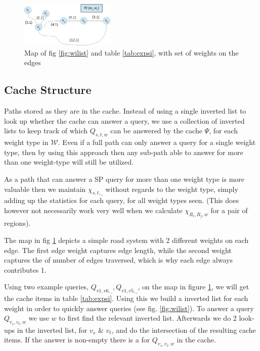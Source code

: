 \begin{figure}[hbt]
  \center
        \includegraphics[width=0.4\textwidth]{figures/map1}
        \caption{Map of fig \ref{fig:wilist} and table \ref{tab:expsi}, with set of weights on the edges}
  \label{fig:map1}
\end{figure}


\subsection{Cache Structure}

Paths stored as they are in the cache. Instead of using a single inverted list to look up whether the cache can answer a query, we use a collection of inverted lists to keep track of which $Q_{s,t,w}$ can be answered by the cache $\Psi$, for each weight type in $\mathcal{W}$.
Even if a full path can only answer a query for a single weight type, then by using this approach then any sub-path able to answer for more than one weight-type will still be utilized. 

As a path that can answer a SP query for more than one weight type is more valuable then we maintain $\chi_{s,t,\_}$ without regards to the weight type, simply adding up the statistics for each query, for all weight types seen. (This does however not necessarily work very well when we calculate $\chi_{R_i,R_j,w}$ for a pair of regions). 

The map in  fig \ref{fig:map1} depicts a simple road system with 2 different weights on each edge. The first edge weight captures edge length, while the second weight captures the of number of edges traversed, which is why each edge always contributes 1.

Using two example queries, $Q_{v1,v6,\_}, Q_{v1,v5,\_}$, on the map in figure \ref{fig:map1}, we will get the cache items in table \ref{tab:expsi}. Using this we build a inverted list for each weight in order to quickly answer queries (see fig. \ref{fig:wilist}). 
To answer a query $Q_{v_s,v_t,w}$ we use $w$ to first find the relevant inverted list. Afterwards we do 2 look-ups in the inverted list, for $v_s$ \& $v_t$, and do the intersection of the resulting cache items. If the answer is non-empty there is a \spath for $Q_{v_s,v_t,w}$ in the cache.

